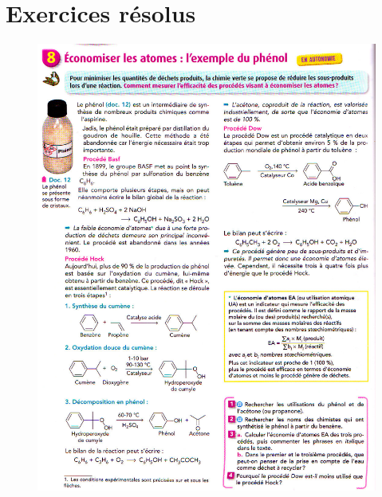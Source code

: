\documentclass[11pt,a4paper]{article}
\begin{document}
\section{Exercices résolus}
\begin{figure}[H]
    \centering
    \includegraphics[width=\linewidth]{imgs/c5/xoVert.jpg}
\end{figure}
\end{document}
